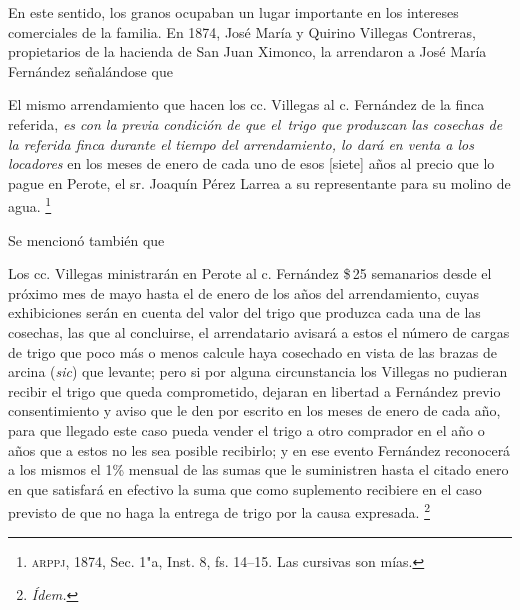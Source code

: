 \documentclass[14pt,twoside,final]{extbook} %
\let\oldfootnote\footnote
\renewcommand\footnote[1]{%
\oldfootnote{\hspace{1mm}#1}}
\begin{document}
En este sentido, los granos ocupaban un lugar importante en los intereses comerciales de la familia. En 1874, José María y Quirino Villegas Contreras, propietarios de la hacienda de San Juan Ximonco, la arrendaron a José María Fernández señalándose que
\begin{quoting}
El mismo arrendamiento que hacen los cc. Villegas al c. Fernández de la finca referida, \emph{es con la previa condición de que el~trigo que produzcan las cosechas de la referida finca durante el tiempo del arrendamiento, lo dará en venta a los locadores} en los meses de enero de cada uno de esos [siete] años al precio que lo pague en Perote, el sr. Joaquín Pérez Larrea a su representante para su molino de agua.\footnote{\textsc{arppj}, 1874, Sec. 1"a, Inst. 8, fs. 14--15. Las cursivas son mías.} 
\end{quoting}
Se mencionó también que
\begin{quoting}
Los cc. Villegas ministrarán en Perote al c. Fernández \$\,25 semanarios desde el próximo mes de mayo hasta el de enero de los años del arrendamiento, cuyas exhibiciones serán en cuenta del valor del trigo que produzca cada una de las cosechas, las que al concluirse, el arrendatario avisará a estos el número de cargas de trigo que poco más o menos calcule haya cosechado en vista de las brazas de arcina (\emph{sic}) que levante; pero si por alguna circunstancia los Villegas no pudieran recibir el trigo que queda comprometido, dejaran en libertad a Fernández previo consentimiento y aviso que le den por escrito en los meses de enero de cada año, para que llegado este caso pueda vender el trigo a otro comprador en el año o años que a estos no les sea posible recibirlo; y en ese evento Fernández reconocerá a los mismos el 1\% mensual de las sumas que le suministren hasta el citado enero en que satisfará en efectivo la suma que como suplemento recibiere en el caso previsto de que no haga la entrega de trigo por la causa expresada.\footnote{\em Ídem.}
\end{quoting}
\end{document}
